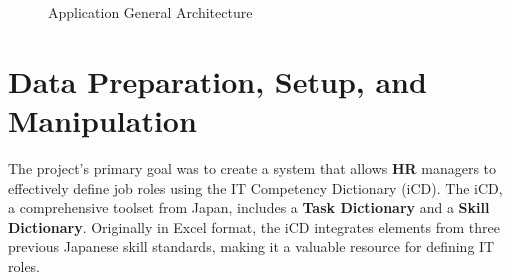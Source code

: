 \begin{figure}[H]
    \centering
    \caption{ Application General Architecture }
    \label{fig: GeneralArchitecture}
\end{figure}

\section{Data Preparation, Setup, and Manipulation}
The project's primary goal was to create a system that allows {\color{newBlue}\textbf{HR}} managers to effectively define job roles using the IT Competency Dictionary (iCD). The iCD, a comprehensive toolset from Japan, includes a {\color{darkPurple}\textbf{Task Dictionary}} and a {\color{darkgreen}\textbf{Skill Dictionary}}. Originally in Excel format, the iCD integrates elements from three previous Japanese skill standards, making it a valuable resource for defining IT roles.



